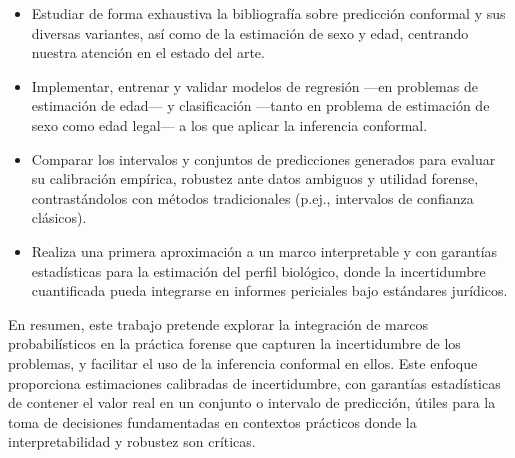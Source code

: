 \begin{itemize}

    \item Estudiar de forma exhaustiva la bibliografía sobre predicción conformal y sus diversas variantes, así como de la estimación de sexo y edad, centrando nuestra atención en el estado del arte.


    \item Implementar, entrenar y validar modelos de regresión ---en problemas de estimación de edad--- y clasificación ---tanto en problema de estimación de sexo como edad legal--- a los que aplicar la inferencia conformal.

    \item Comparar los intervalos y conjuntos de predicciones generados para evaluar su calibración empírica, robustez ante datos ambiguos y utilidad forense, contrastándolos con métodos tradicionales (p.ej., intervalos de confianza clásicos).  

    \item Realiza una primera aproximación a un marco interpretable y con garantías estadísticas para la estimación del perfil biológico, donde la incertidumbre cuantificada pueda integrarse en informes periciales bajo estándares jurídicos.

\end{itemize}


En resumen, este trabajo pretende explorar la integración de marcos probabilísticos en la práctica forense que capturen la incertidumbre de los problemas, y facilitar el uso de la inferencia conformal en ellos. Este enfoque proporciona estimaciones calibradas de incertidumbre, con garantías estadísticas de contener el valor real en un conjunto o intervalo de predicción, útiles para la toma de decisiones fundamentadas en contextos prácticos donde la interpretabilidad y robustez son críticas.

